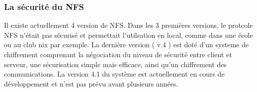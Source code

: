 \subsubsection{La sécurité du NFS}

Il existe actuellement 4 version de NFS. Dans les 3 premières versions, le protcole NFS n'était pas sécurisé et permettait l'utilsation en local, comme dans une école ou au club nix par exemple. La dernière version ( v.4 ) est doté d'un systeme de chiffrement comprenant la négociation du niveau de sécurité entre client et serveur, une sécurisation simple mais efficace, ainsi qu'un chiffrement des communications.
La version 4.1 du système est actuellement en cours de développement et n'est pas prévu avant plusieurs années.
